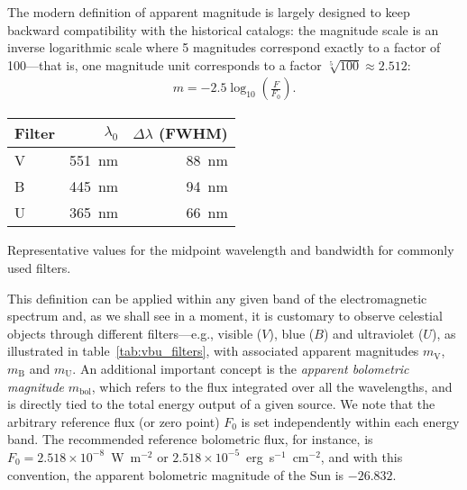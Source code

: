 The modern definition of apparent magnitude%
is largely designed to keep backward compatibility with the historical catalogs:
the magnitude scale is an inverse logarithmic scale where 5 magnitudes correspond
exactly to a factor of 100---that is, one magnitude
unit corresponds to a factor $\sqrt[5]{100} \approx 2.512$:
\begin{align}
  m = -2.5 \log_{10} \left( \frac{F}{F_0} \right).
\end{align}

\begin{margintable}
  \begin{tabular}{lrr}
    \hline
    Filter & $\lambda_0$ & $\Delta\lambda$ (FWHM)\\
    \hline
    \hline
    V & 551~nm & 88~nm\\
    B & 445~nm & 94~nm\\
    U & 365~nm & 66~nm\\
    \hline
  \end{tabular}
  \caption{Representative values for the midpoint wavelength and bandwidth for
    commonly used filters.}
  \label{tab:vbu_filters}
\end{margintable}

This definition can be applied within any given band of the electromagnetic
spectrum and, as we shall see in a moment, it is customary to observe celestial
objects through different filters---e.g., visible ($V$), blue ($B$) and
ultraviolet ($U$), as illustrated in table~\ref{tab:vbu_filters}, with associated
apparent magnitudes $m_\text{V}$, $m_\text{B}$ and $m_\text{U}$.
An additional important concept is the \emph{apparent bolometric magnitude}
$m_\text{bol}$, which refers to the flux integrated over all the wavelengths, and
is directly tied to the total energy output of a given source. We note that the
arbitrary reference flux (or zero point) $F_0$ is set independently within each
energy band. The recommended reference bolometric flux, for instance, is
$F_0 = 2.518 \times 10^{-8}$~W~m$^{-2}$ or $2.518 \times 10^{-5}$~erg~s$^{-1}$~cm$^{-2}$,
and with this convention, the apparent bolometric magnitude of the Sun is
$-26.832$.

